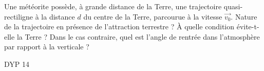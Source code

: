 \begin{Exercise}[title=Chute d'une comète]
  Une météorite possède, à grande distance de la Terre, une trajectoire quasi-rectiligne à la distance $d$ du centre de la Terre, parcourue à la vitesse $\vec{v_0}$.
    \Question Nature de la trajectoire en présence de l'attraction  terrestre ?
    \Question À quelle condition évite-t-elle la Terre ?
    \Question Dans le cas contraire, quel est l'angle de rentrée dans l'atmosphère par rapport à la verticale ?
\end{Exercise}
\begin{Answer}
DYP 14
\end{Answer}
